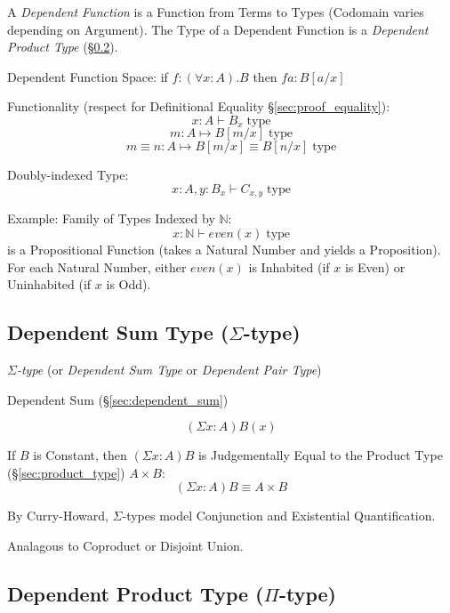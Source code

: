 A \emph{Dependent Function} is a Function from Terms to Types
(Codomain varies depending on Argument). The Type of a Dependent
Function is a \emph{Dependent Product Type}
(\S\ref{sec:pi_type}).

Dependent Function Space: if $f:(\forall x: A).B$ then $f a : B[a/x]$

Functionality (respect for Definitional Equality
\S\ref{sec:proof_equality}):
\[
  x : A \vdash B_x \;\text{type}
\]\[
  m : A \mapsto B[m/x] \;\text{type}
\]\[
  m \equiv n : A \mapsto B[m/x] \equiv B[n/x] \;\text{type}
\]

Doubly-indexed Type:
\[
  x : A, y : B_x \vdash C_{x,y} \;\text{type}
\]

Example: Family of Types Indexed by $\mathbb{N}$:
\[
  x : \mathbb{N} \vdash even(x) \;\text{type}
\]
is a Propositional Function (takes a Natural Number and yields a
Proposition). For each Natural Number, either $even(x)$ is Inhabited
(if $x$ is Even) or Uninhabited (if $x$ is Odd).\cite{harper12}



\subsection{Dependent Sum Type ($\Sigma$-type)}\label{sec:sigma_type}

\emph{$\Sigma$-type} (or \emph{Dependent Sum Type} or \emph{Dependent
  Pair Type})

Dependent Sum (\S\ref{sec:dependent_sum})

\[
  (\Sigma x:A) B(x)
\]

If $B$ is Constant, then $(\Sigma x:A)B$ is Judgementally Equal to
the Product Type (\S\ref{sec:product_type}) $A \times B$:
\[
  (\Sigma x:A) B \equiv A \times B
\]

By Curry-Howard, $\Sigma$-types model Conjunction and Existential
Quantification.

Analagous to Coproduct or Disjoint Union.



\subsection{Dependent Product Type ($\Pi$-type)}\label{sec:pi_type}

